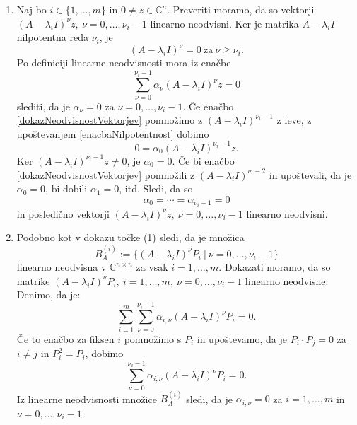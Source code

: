 \documentclass[mat1]{fmfdelo}
\newcommand{\C}{\mathbb C}
\begin{document}
\begin{dokaz}
    \leavevmode
    \begin{enumerate}
        \item Naj bo $i \in \{1, \ldots, m\}$ in $0 \neq z \in \C^n$. Preveriti moramo, da so vektorji $(A - \lambda_i I)^\nu z,\ \nu = 0, \ldots, \nu_i-1$ linearno neodvisni. Ker je matrika $A - \lambda_i I$ nilpotentna reda $\nu_i$, je
        \begin{equation}\label{enacbaNilpotentnost}
            (A - \lambda_i I)^\nu = 0\ \text{za}\ \nu \geq \nu_i.
        \end{equation}
        Po definiciji linearne neodvisnosti mora iz enačbe
        \begin{equation}\label{dokazNeodvisnostVektorjev}
            \sum_{\nu = 0}^{\nu_i - 1} \alpha_\nu (A - \lambda_i I)^\nu z = 0
        \end{equation}
        slediti, da je $\alpha_\nu = 0$ za $\nu = 0, \ldots, \nu_i-1$. Če enačbo \eqref{dokazNeodvisnostVektorjev} pomnožimo z $(A - \lambda_i I)^{\nu_i-1}$ z leve, z upoštevanjem \eqref{enacbaNilpotentnost} dobimo
        \begin{equation*}
            0 = \alpha_0 (A-\lambda_i I)^{\nu_i-1} z.
        \end{equation*}
        Ker $(A-\lambda_i I)^{\nu_i-1} z \neq 0$, je $\alpha_0 = 0$. Če bi enačbo \eqref{dokazNeodvisnostVektorjev} pomnožili z $(A - \lambda_i I)^{\nu_i-2}$ in upoštevali, da je $\alpha_0 = 0$, bi dobili $\alpha_1 = 0$, itd. Sledi, da so \[\alpha_0 = \cdots = \alpha_{\nu_i - 1} = 0\] in posledično vektorji $(A - \lambda_i I)^\nu z,\ \nu = 0, \ldots, \nu_i-1$ linearno neodvisni.

        \item Podobno kot v dokazu točke (1) sledi, da je množica
        \begin{equation*}
            B_A^{(i)} := \{(A-\lambda_i I)^\nu P_i\ |\ \nu = 0, \ldots, \nu_i-1\}
        \end{equation*}
        linearno neodvisna v $\C^{n \times n}$ za vsak $i = 1, \ldots, m$. Dokazati moramo, da so matrike $(A-\lambda_i I)^{\nu} P_i,\ i = 1, \ldots, m,\ \nu = 0, \ldots, \nu_i-1$ linearno neodvisne. Denimo, da je:
        \begin{equation*}
            \sum_{i=1}^m \sum_{\nu=0}^{\nu_i-1} \alpha_{i, \nu} (A-\lambda_i I)^{\nu} P_i = 0.
        \end{equation*}
        Če to enačbo za fiksen $i$ pomnožimo s $P_i$ in upoštevamo, da je $P_i \cdot P_j = 0$ za $i \neq j$ in $P_i^2 = P_i$, dobimo
        \begin{equation*}
            \sum_{\nu = 0}^{\nu_i - 1} \alpha_{i, \nu} (A-\lambda_i I)^{\nu} P_i = 0.
        \end{equation*}
        Iz linearne neodvisnosti množice $B_A^{(i)}$ sledi, da je $\alpha_{i, \nu} = 0$ za $i = 1, \ldots, m$ in $\nu = 0, \ldots, \nu_i-1$.
    \end{enumerate}
\end{dokaz}
\end{document}
